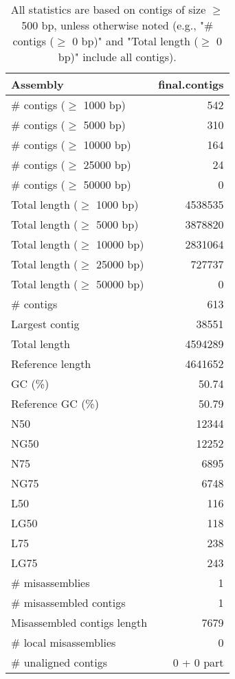 \documentclass[12pt,a4paper]{article}
\begin{document}
\begin{table}[ht]
\begin{center}
\caption{All statistics are based on contigs of size $\geq$ 500 bp, unless otherwise noted (e.g., "\# contigs ($\geq$ 0 bp)" and "Total length ($\geq$ 0 bp)" include all contigs).}
\begin{tabular}{|l*{1}{|r}|}
\hline
Assembly & final.contigs \\ \hline
\# contigs ($\geq$ 1000 bp) & 542 \\ \hline
\# contigs ($\geq$ 5000 bp) & 310 \\ \hline
\# contigs ($\geq$ 10000 bp) & 164 \\ \hline
\# contigs ($\geq$ 25000 bp) & 24 \\ \hline
\# contigs ($\geq$ 50000 bp) & 0 \\ \hline
Total length ($\geq$ 1000 bp) & 4538535 \\ \hline
Total length ($\geq$ 5000 bp) & 3878820 \\ \hline
Total length ($\geq$ 10000 bp) & 2831064 \\ \hline
Total length ($\geq$ 25000 bp) & 727737 \\ \hline
Total length ($\geq$ 50000 bp) & 0 \\ \hline
\# contigs & 613 \\ \hline
Largest contig & 38551 \\ \hline
Total length & 4594289 \\ \hline
Reference length & 4641652 \\ \hline
GC (\%) & 50.74 \\ \hline
Reference GC (\%) & 50.79 \\ \hline
N50 & 12344 \\ \hline
NG50 & 12252 \\ \hline
N75 & 6895 \\ \hline
NG75 & 6748 \\ \hline
L50 & 116 \\ \hline
LG50 & 118 \\ \hline
L75 & 238 \\ \hline
LG75 & 243 \\ \hline
\# misassemblies & 1 \\ \hline
\# misassembled contigs & 1 \\ \hline
Misassembled contigs length & 7679 \\ \hline
\# local misassemblies & 0 \\ \hline
\# unaligned contigs & 0 + 0 part \\ \hline

\end{tabular}
\end{center}
\end{table}
\end{document}

